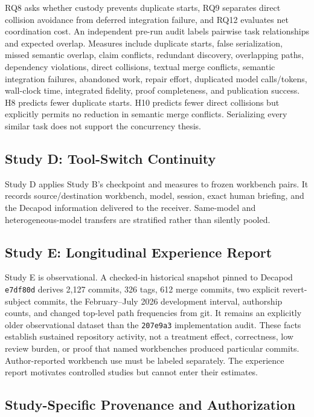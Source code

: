 RQ8 asks whether custody prevents duplicate starts, RQ9 separates direct collision avoidance from deferred integration failure, and RQ12 evaluates net coordination cost. An independent pre-run audit labels pairwise task relationships and expected overlap. Measures include duplicate starts, false serialization, missed semantic overlap, claim conflicts, redundant discovery, overlapping paths, dependency violations, direct collisions, textual merge conflicts, semantic integration failures, abandoned work, repair effort, duplicated model calls/tokens, wall-clock time, integrated fidelity, proof completeness, and publication success. H8 predicts fewer duplicate starts. H10 predicts fewer direct collisions but explicitly permits no reduction in semantic merge conflicts. Serializing every similar task does not support the concurrency thesis.

\subsection{Study D: Tool-Switch Continuity}

Study D applies Study B's checkpoint and measures to frozen workbench pairs. It records source/destination workbench, model, session, exact human briefing, and the Decapod information delivered to the receiver. Same-model and heterogeneous-model transfers are stratified rather than silently pooled.

\subsection{Study E: Longitudinal Experience Report}

Study E is observational. A checked-in historical snapshot pinned to Decapod \texttt{e7df80d} derives 2,127 commits, 326 tags, 612 merge commits, two explicit revert-subject commits, the February--July 2026 development interval, authorship counts, and changed top-level path frequencies from git. It remains an explicitly older observational dataset than the \texttt{207e9a3} implementation audit. These facts establish sustained repository activity, not a treatment effect, correctness, low review burden, or proof that named workbenches produced particular commits. Author-reported workbench use must be labeled separately. The experience report motivates controlled studies but cannot enter their estimates.

\subsection{Study-Specific Provenance and Authorization}

